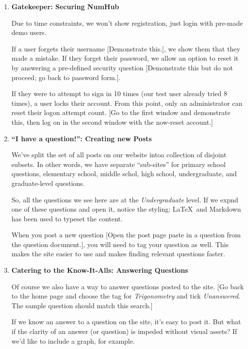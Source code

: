 \documentclass[12pt]{article}
\begin{document}
	\begin{enumerate}[label={(\arabic*)}]
		\item {\bfseries Gatekeeper: Securing {\sffamily NumHub}}

			Due to time constraints, we won't show registration, just login with pre-made demo users.


			If a user forgets their username [Demonstrate this.], we show them that they made a mistake. If they forget their password, we allow an option to reset it by answering a pre-defined security question [Demonstrate this but do not proceed; go back to password form.]. 

			If they were to attempt to sign in 10 times (our test user already tried 8 times), a user locks their account. From this point, only an administrator can reset their logon attempt count. [Go to the first window and demonstrate this, then log on in the second window with the now-reset account.]

		\item {\bfseries ``I have a question!'': Creating new Posts}

			We've split the set of all posts on our website intoa collection of disjoint subsets. In other words, we have separate ``sub-sites'' for primary school questions, elementary school, middle schol, high school, undergraduate, and graduate-level questions. 

			So, all the questions we see here are at the {\em Undergraduate} level. If we expnd one of these questions and open it, notice the styling: \LaTeX\ and Markdown has been used to typeset the content. 

			When you post a new question [Open the post page paste in a question from the question document.], you will need to tag your question as well. This makes the site easier to use and makes finding relevant questions faster.

		\item {\bfseries Catering to the Know-It-Alls: Answering Questions}

			Of course we also have a way to answer questions posted to the site. [Go back to the home page and choose the tag for {\em Trigonometry} and tick {\em Unanswered}. The sample question should match this search.] 

			If we know an answer to a question on the site, it's easy to post it. But what if the clarity of an answer (or question) is impeded without visual assets? If we'd like to include a graph, for example. 


\end{enumerate}
\end{document}
